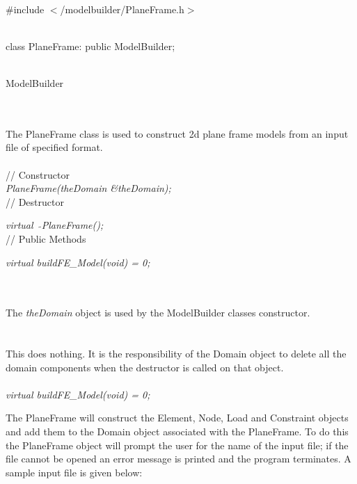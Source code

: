 
   \\
\#include $<$/modelbuilder/PlaneFrame.h$>$  


  \\
class PlaneFrame: public ModelBuilder;  


 \\
ModelBuilder 

\indent{} \\

 \\ 
\indent The PlaneFrame class is used to construct 2d plane frame
models from an input file of specified format. \\

 \\ 
\indent // Constructor \\ 
{\em PlaneFrame(theDomain \&theDomain);}\\ 

// Destructor 

{\em virtual~ $\tilde{}$PlaneFrame();}\\ 

// Public Methods 

{\em virtual buildFE\_Model(void) = 0;} 



 \\ 
\\ 
The {\em theDomain} object is used by the ModelBuilder classes 
constructor. \\ 

 \\
\\ 
This does nothing. It is the responsibility of the Domain object to delete
all the domain components when the destructor is called on that object. \\

 \\
{\em virtual buildFE\_Model(void) = 0;} 

The PlaneFrame will construct the Element, Node, Load and Constraint
objects and add them to the Domain object associated with the PlaneFrame. 
To do this the PlaneFrame object will prompt the user for the name of 
the input file; if the file cannot be opened an error message is
printed and the program terminates. A sample input file is given below: \\

